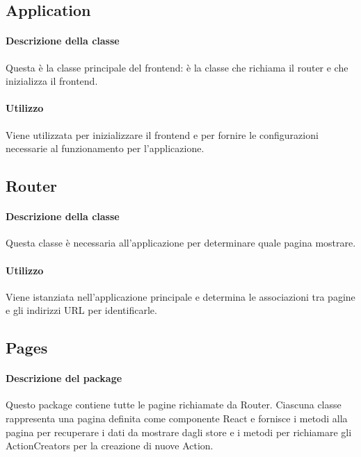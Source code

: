 \subsection{Application}
\paragraph*{Descrizione della classe}
Questa è la classe principale del frontend: è la classe che richiama il router e che inizializza il frontend.
\paragraph*{Utilizzo}
Viene utilizzata per inizializzare il frontend e per fornire le configurazioni necessarie al funzionamento per l'applicazione.

\subsection{Router}
\paragraph*{Descrizione della classe}
Questa classe è necessaria all'applicazione per determinare quale pagina mostrare.
\paragraph*{Utilizzo}
Viene istanziata nell'applicazione principale e determina le associazioni tra pagine e gli indirizzi URL per identificarle.

\subsection{Pages}
\paragraph*{Descrizione del package}
Questo package contiene tutte le pagine richiamate da Router. Ciascuna classe rappresenta una pagina definita come componente React e fornisce i metodi alla pagina per recuperare i dati da mostrare dagli store e i metodi per richiamare gli ActionCreators per la creazione di nuove Action.
